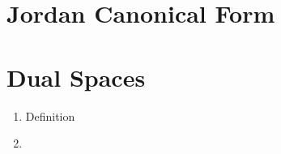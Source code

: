 \chapter{Jordan Canonical Form}



















\chapter{Dual Spaces}

\begin{enumerate}
	\item Definition
	\item 
\end{enumerate}









